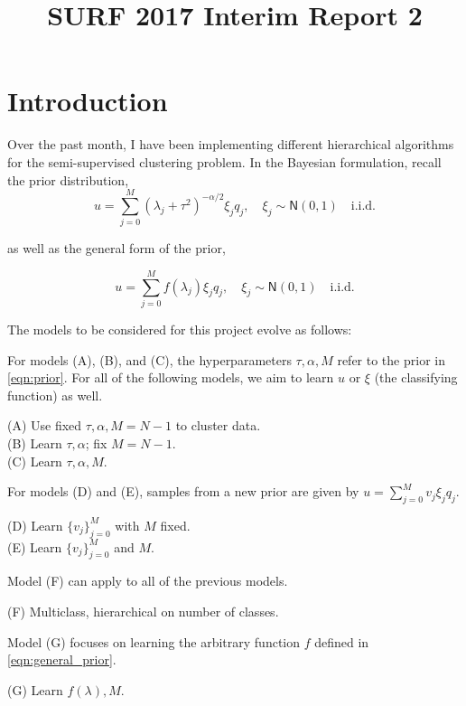 \documentclass{siamart1116}
\title{SURF 2017 Interim Report 2}
\author{\TheAuthors}
\date{}
\begin{document}
\maketitle
\setlength{\unitlength}{1in}
\setlength{\parindent}{0in}

\section{Introduction}
    Over the past month, I have been implementing different hierarchical algorithms for the semi-supervised clustering problem. In the Bayesian formulation, recall the prior distribution,
    \begin{equation}
    \label{eqn:prior}
    u = \sum_{j=0}^M (\lambda_j + \tau^2)^{-\alpha/2}\xi_j q_j,\quad \xi_j\sim \mathsf{N}(0,1) \quad \text{i.i.d.}
    \end{equation}

    as well as the general form of the prior,

    \begin{equation}
    \label{eqn:general_prior}
    u = \sum_{j=0}^M f(\lambda_j)\xi_j q_j,\quad \xi_j\sim \mathsf{N}(0,1) \quad \text{i.i.d.}
    \end{equation}

    The models to be considered for this project evolve as follows:

    For models (A), (B), and (C), the hyperparameters $\tau,\alpha,M$ refer to the prior in \cref{eqn:prior}. For all of the following models, we aim to learn $u$ or $\xi$ (the classifying function) as well.

    (A) Use fixed $\tau,\alpha, M=N-1$ to cluster data.\\
    (B) Learn $\tau,\alpha$; fix $M=N-1$.\\
    (C) Learn $\tau,\alpha,M$.

    For models (D) and (E), samples from a new prior are given by $u = \sum_{j=0}^M v_j\xi_j q_j$.

    (D) Learn $\{v_j\}_{j=0}^M$ with $M$ fixed.\\
    (E) Learn $\{v_j\}_{j=0}^M$ and $M$.

    Model (F) can apply to all of the previous models.

    (F) Multiclass, hierarchical on number of classes.

    Model (G) focuses on learning the arbitrary function $f$ defined in \cref{eqn:general_prior}. 

    (G) Learn $f(\lambda), M$.
\end{document}
